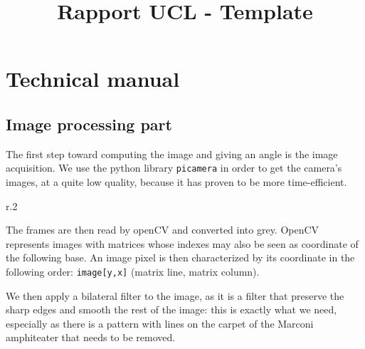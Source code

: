 \documentclass{rapport}
\title{Rapport UCL - Template} %
\begin{document}



        
\fairemarges %
\fairepagedegarde %
\tableofcontents%
\newpage


\section{Technical manual}

\subsection{Image processing part}

The first step toward computing the image and giving an angle is the image acquisition. We use the python library \verb|picamera| in order to get the camera's images, at a quite low quality, because it has proven to be more time-efficient.

\begin{wrapfigure}{r}{.2\textwidth}
\end{wrapfigure}

The frames are then read by openCV and converted into grey. OpenCV represents images with matrices whose indexes may also be seen as coordinate of the following base. An image pixel is then characterized by its coordinate in the following order: \verb|image[y,x]| (matrix line, matrix column).

We then apply a bilateral filter to the image, as it is a filter that preserve the sharp edges and smooth the rest of the image: this is exactly what we need, especially as there is a pattern with lines on the carpet of the Marconi amphiteater that needs to be removed.

\end{document}
